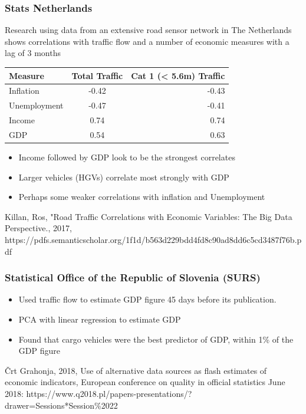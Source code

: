 \documentclass[11pt]{article}
\providecommand{\tightlist}{%
      \setlength{\itemsep}{0pt}\setlength{\parskip}{0pt}}
\begin{document}
    \subsubsection{Stats Netherlands}\label{stats-netherlands}

Research using data from an extensive road sensor network in The
Netherlands shows correlations with traffic flow and a number of
economic measures with a lag of 3 months

\begin{longtable}[c]{@{}lcr@{}}
\toprule
Measure & Total Traffic & Cat 1 (\textless{} 5.6m)
Traffic\tabularnewline
\midrule
\endhead
Inflation & -0.42 & -0.43\tabularnewline
Unemployment & -0.47 & -0.41\tabularnewline
Income & 0.74 & 0.74\tabularnewline
GDP & 0.54 & 0.63\tabularnewline
\bottomrule
\end{longtable}

    \begin{itemize}
\tightlist
\item
  Income followed by GDP look to be the strongest correlates
\item
  Larger vehicles (HGVs) correlate most strongly with GDP
\item
  Perhaps some weaker correlations with inflation and Unemployment
\end{itemize}

    Killan, Ros, "Road Traffic Correlations with Economic Variables: The Big
Data Perspective., 2017,
https://pdfs.semanticscholar.org/1f1d/b563d229bdd4fd8c90ad8dd6c5cd3487f76b.pdf

    \subsubsection{Statistical Office of the Republic of Slovenia
(SURS)}\label{statistical-office-of-the-republic-of-slovenia-surs}

    \begin{itemize}
\tightlist
\item
  Used traffic flow to estimate GDP figure 45 days before its
  publication.
\item
  PCA with linear regression to estimate GDP
\item
  Found that cargo vehicles were the best predictor of GDP, within 1\%
  of the GDP figure
\end{itemize}

    Črt Grahonja, 2018, Use of alternative data sources as flash estimates
of economic indicators, European conference on quality in official
statistics June 2018:
https://www.q2018.pl/papers-presentations/?drawer=Sessions*Session\%2022
\end{document}
